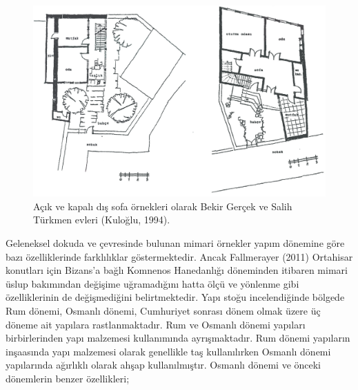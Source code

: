 \documentclass[12pt,turkish,a4paperpaper,]{report}
\begin{document}
\begin{figure}
\centering
\includegraphics[width=1\textwidth,height=\textheight]{source/figures/disSofaliPlanlar.jpg}
\caption{Açık ve kapalı dış sofa örnekleri olarak Bekir Gerçek ve Salih
Türkmen evleri (Kuloğlu, 1994).}
\end{figure}

Geleneksel dokuda ve çevresinde bulunan mimari örnekler yapım dönemine
göre bazı özelliklerinde farklılıklar göstermektedir. Ancak Fallmerayer
(2011) Ortahisar konutları için Bizans'a bağlı Komnenos Hanedanlığı
döneminden itibaren mimari üslup bakımından değişime uğramadığını hatta
ölçü ve yönlenme gibi özelliklerinin de değişmediğini belirtmektedir.
Yapı stoğu incelendiğinde bölgede Rum dönemi, Osmanlı dönemi, Cumhuriyet
sonrası dönem olmak üzere üç döneme ait yapılara rastlanmaktadır. Rum ve
Osmanlı dönemi yapıları birbirlerinden yapı malzemesi kullanımında
ayrışmaktadır. Rum dönemi yapıların inşaasında yapı malzemesi olarak
genellikle taş kullanılırken Osmanlı dönemi yapılarında ağırlıklı olarak
ahşap kullanılmıştır. Osmanlı dönemi ve önceki dönemlerin benzer
özellikleri;
\end{document}
